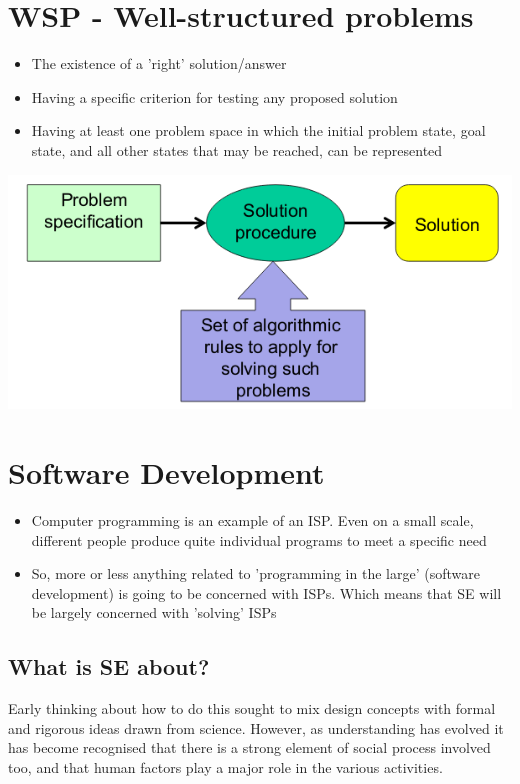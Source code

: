 \documentclass{article}[18pt]
\begin{document}
\section{WSP - Well-structured problems}
\begin{itemize}
	\item The existence of a 'right' solution/answer
	\item Having a specific criterion for testing any proposed solution
	\item Having at least one problem space in which the initial problem state, goal state, and all other states that may be reached, can be represented
\end{itemize}
\begin{center}
	\includegraphics[scale=0.7]{Solve}
\end{center}
\section{Software Development}
\begin{itemize}
	\item Computer programming is an example of an ISP. Even on a small scale, different people produce quite individual programs to meet a specific need
	\item So, more or less anything related to 'programming in the large' (software development) is going to be concerned with ISPs. Which means that SE will be largely concerned with 'solving' ISPs
\end{itemize}
\subsection{What is SE about?}
Early thinking about how to do this sought to mix design concepts with formal and rigorous ideas drawn from science.  However, as understanding has evolved it has become recognised that there is a strong element of social process involved too, and that human factors play a major role in the various activities.
\end{document}
